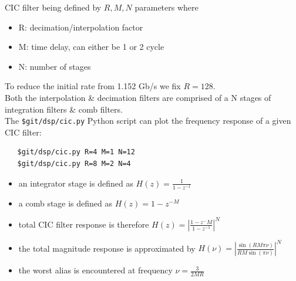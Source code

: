 \documentclass{article}
\begin{document}
CIC filter being defined by $R, M, N$ parameters where

\begin{itemize}
	\item R: decimation/interpolation factor
	\item M: time delay, can either be 1 or 2 cycle
	\item N: number of stages
\end{itemize}

\vspace{0.2cm}
To reduce the initial rate from 1.152 Gb/s we fix
$R = 128$. \\

Both the interpolation \& decimation filters
are comprised of a N stages of integration filters
\& comb filters. \\

The {\tt \$git/dsp/cic.py} Python script 
can plot the frequency response
of a given CIC filter:

\begin{verbatim}
   $git/dsp/cic.py R=4 M=1 N=12
   $git/dsp/cic.py R=8 M=2 N=4
\end{verbatim}


\begin{itemize}
	\item an integrator stage is defined as $H(z) = \frac{1}{1 - z^{-1}}$\\
	
	\item a comb stage is defined as $H(z) = 1 - z^{-M}$\\
	
	\item total CIC filter response is therefore $H(z) = \left| \frac{1 - z^-M}{1 - z^{-1}} \right|^N$
	
	\item the total magnitude response is approximated by
	$H(\nu) = \left| \frac{\sin(R M \pi \nu)}{R M \sin(\pi \nu)} \right|^N$

	\item the worst alias is encountered at frequency $\nu = \frac{3}{2MR}$
\end{itemize}
\end{document}
